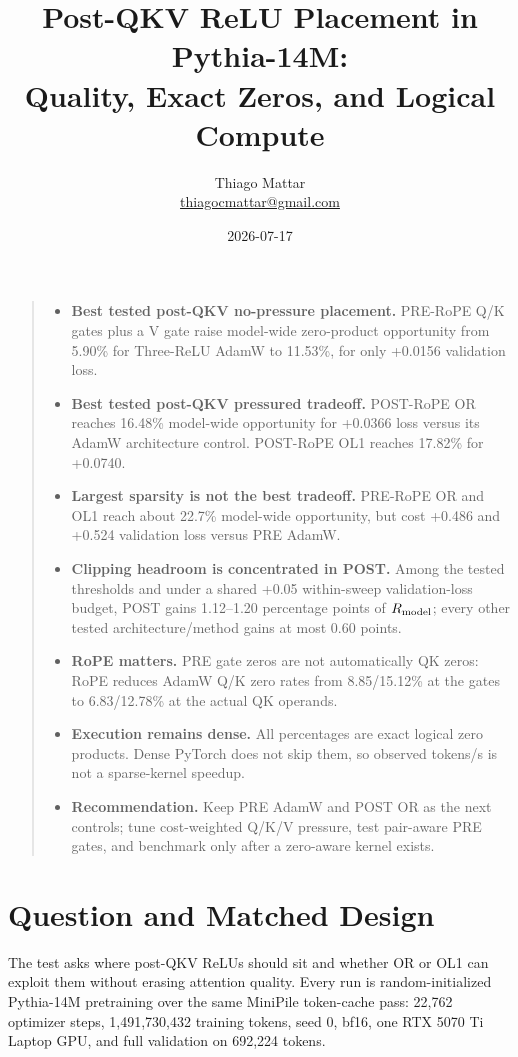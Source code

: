 \documentclass[10pt]{article}
\title{Post-QKV ReLU Placement in Pythia-14M:\\Quality, Exact Zeros, and Logical Compute}
\author{Thiago Mattar\\\href{mailto:thiagocmattar@gmail.com}{thiagocmattar@gmail.com}}
\date{2026-07-17}
\newcommand{\pct}{\%}
\newcommand{\tightsection}[1]{\section{#1}\vspace{-0.35em}}
\begin{document}
\maketitle
\vspace{-1.35em}

\begin{quote}
\begin{itemize}[leftmargin=1.2em]
\item \textbf{Best tested post-QKV no-pressure placement.} PRE-RoPE Q/K gates plus a V gate raise model-wide zero-product opportunity from 5.90\pct{} for Three-ReLU AdamW to 11.53\pct{}, for only +0.0156 validation loss.
\item \textbf{Best tested post-QKV pressured tradeoff.} POST-RoPE OR reaches 16.48\pct{} model-wide opportunity for +0.0366 loss versus its AdamW architecture control. POST-RoPE OL1 reaches 17.82\pct{} for +0.0740.
\item \textbf{Largest sparsity is not the best tradeoff.} PRE-RoPE OR and OL1 reach about 22.7\pct{} model-wide opportunity, but cost +0.486 and +0.524 validation loss versus PRE AdamW.
\item \textbf{Clipping headroom is concentrated in POST.} Among the tested thresholds and under a shared +0.05 within-sweep validation-loss budget, POST gains 1.12--1.20 percentage points of $R_{\rm model}$; every other tested architecture/method gains at most 0.60 points.
\item \textbf{RoPE matters.} PRE gate zeros are not automatically QK zeros: RoPE reduces AdamW Q/K zero rates from 8.85/15.12\pct{} at the gates to 6.83/12.78\pct{} at the actual QK operands.
\item \textbf{Execution remains dense.} All percentages are exact logical zero products. Dense PyTorch does not skip them, so observed tokens/s is not a sparse-kernel speedup.
\item \textbf{Recommendation.} Keep PRE AdamW and POST OR as the next controls; tune cost-weighted Q/K/V pressure, test pair-aware PRE gates, and benchmark only after a zero-aware kernel exists.
\end{itemize}
\end{quote}

\tightsection{Question and Matched Design}

The test asks where post-QKV ReLUs should sit and whether OR or OL1 can exploit them without erasing attention quality. Every run is random-initialized Pythia-14M pretraining over the same MiniPile token-cache pass: 22,762 optimizer steps, 1,491,730,432 training tokens, seed 0, bf16, one RTX 5070 Ti Laptop GPU, and full validation on 692,224 tokens.
\end{document}
